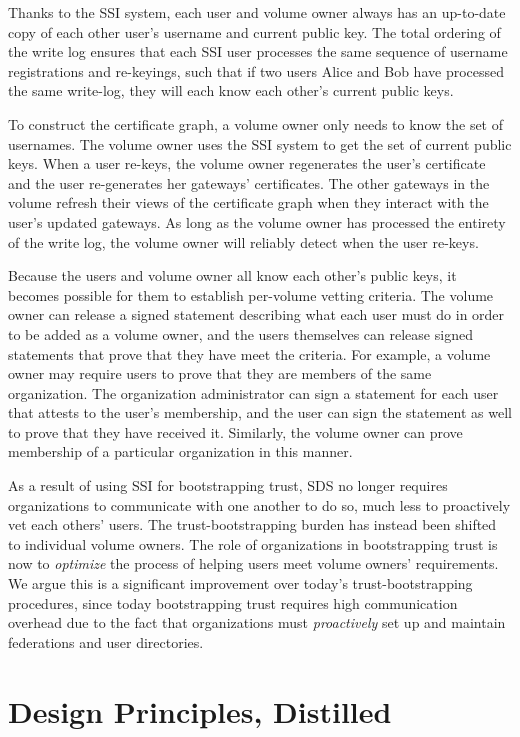 Thanks to the SSI system, each user and volume owner always has an up-to-date
copy of each other user's username and current public key.  The total ordering
of the write log ensures that each SSI user processes the same sequence of
username registrations and re-keyings, such that if two users Alice and Bob have
processed the same write-log, they will each know each other's current public
keys.

To construct the certificate graph, a volume owner only needs to know the set of
usernames.  The volume owner uses the SSI system to get the set of current
public keys.  When a user re-keys, the volume owner regenerates the user's
certificate and the user re-generates her gateways' certificates.  The other
gateways in the volume refresh their views of the certificate graph when they
interact with the user's updated gateways.  As long as the volume owner has
processed the entirety of the write log, the volume owner will reliably detect
when the user re-keys.

Because the users and volume owner all know each other's public keys, it becomes
possible for them to establish per-volume vetting criteria.  The volume owner
can release a signed statement describing what each user must do in order to be
added as a volume owner, and the users themselves can release signed statements
that prove that they have meet the criteria.  For example, a volume owner may
require users to prove that they are members of the same organization.  The
organization administrator can sign a statement for each user that attests to the user's
membership, and the user can sign the statement as well to prove that they have
received it.  Similarly, the volume owner can prove membership of a particular
organization in this manner.

As a result of using SSI for bootstrapping trust, SDS no longer requires
organizations to communicate with one another to do so, much less to proactively vet each
others' users.  The trust-bootstrapping burden has instead been shifted to individual volume owners.
The role of organizations in bootstrapping trust is now to \emph{optimize} the
process of helping users meet volume owners' requirements.  We argue this is a
significant improvement over today's trust-bootstrapping procedures, since today
bootstrapping trust requires high communication overhead due to the fact that
organizations must \emph{proactively} set up and maintain federations and user
directories.

\section{Design Principles, Distilled}

